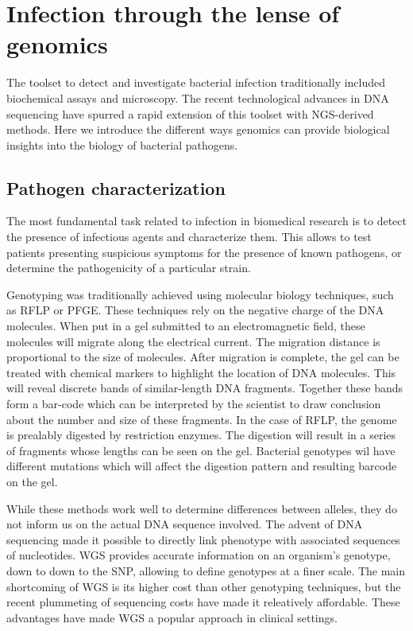 
\chapter{Infection through the lense of genomics} %

\label{ch:01-02} %


The toolset to detect and investigate bacterial infection traditionally included biochemical assays and microscopy. The recent technological advances in DNA sequencing have spurred a rapid extension of this toolset with NGS-derived methods. Here we introduce the different ways genomics can provide biological insights into the biology of bacterial pathogens.

\section{Pathogen characterization}

The most fundamental task related to infection in biomedical research is to detect the presence of infectious agents and characterize them. This allows to test patients presenting suspicious symptoms for the presence of known pathogens, or determine the pathogenicity of a particular strain. 

Genotyping was traditionally achieved using molecular biology techniques, such as \acrfull{RFLP} or \acrfull{PFGE}. These techniques rely on the negative charge of the DNA molecules. When put in a gel submitted to an electromagnetic field, these molecules will migrate along the electrical current. The migration distance is proportional to the size of molecules. After migration is complete, the gel can be treated with chemical markers to highlight the location of DNA molecules. This will reveal discrete bands of similar-length DNA fragments. Together these bands form a bar-code which can be interpreted by the scientist to draw conclusion about the number and size of these fragments. In the case of \acrshort{RFLP}, the genome is prealably digested by \Gls{restriction enzyme}s. The digestion will result in a series of fragments whose lengths can be seen on the gel. Bacterial genotypes wil have different mutations which will affect the digestion pattern and resulting barcode on the gel.

While these methods work well to determine differences between alleles, they do not inform us on the actual DNA sequence involved. The advent of DNA sequencing made it possible to directly link phenotype with associated sequences of nucleotides. \acrfull{WGS} provides accurate information on an organism's genotype, down to down to the \acrfull{SNP}, allowing to define genotypes at a finer scale. The main shortcoming of \acrshort{WGS} is its higher cost than other genotyping techniques, but the recent plummeting of sequencing costs have made it releatively affordable. These advantages have made \acrshort{WGS} a popular approach in clinical settings.

